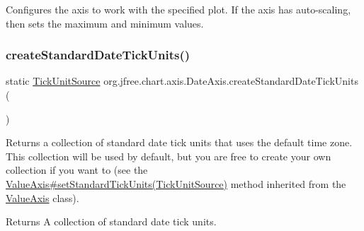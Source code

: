 Configures the axis to work with the specified plot. If the axis has auto-\/scaling, then sets the maximum and minimum values. \mbox{\label{classorg_1_1jfree_1_1chart_1_1axis_1_1_date_axis_a5ebf7393323897c1e51fef720227afe6}} 
\subsubsection{\texorpdfstring{create\+Standard\+Date\+Tick\+Units()}{createStandardDateTickUnits()}\hspace{0.1cm}{\footnotesize\ttfamily [1/3]}}
{\footnotesize\ttfamily static \mbox{\hyperlink{interfaceorg_1_1jfree_1_1chart_1_1axis_1_1_tick_unit_source}{Tick\+Unit\+Source}} org.\+jfree.\+chart.\+axis.\+Date\+Axis.\+create\+Standard\+Date\+Tick\+Units (\begin{DoxyParamCaption}{ }\end{DoxyParamCaption})\hspace{0.3cm}{\ttfamily [static]}}

Returns a collection of standard date tick units that uses the default time zone. This collection will be used by default, but you are free to create your own collection if you want to (see the \mbox{\hyperlink{classorg_1_1jfree_1_1chart_1_1axis_1_1_value_axis_ac84e1ffa28cdea7b355306ae472d21a2}{Value\+Axis\#set\+Standard\+Tick\+Units(\+Tick\+Unit\+Source)}} method inherited from the \mbox{\hyperlink{classorg_1_1jfree_1_1chart_1_1axis_1_1_value_axis}{Value\+Axis}} class).

\begin{DoxyReturn}{Returns}
A collection of standard date tick units. 
\end{DoxyReturn}
\mbox{\label{classorg_1_1jfree_1_1chart_1_1axis_1_1_date_axis_aff43c1aad323f507597948df3ceea8c4}} 
